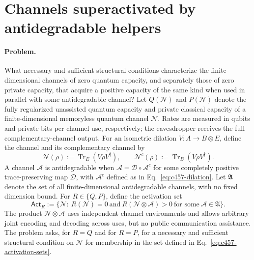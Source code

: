 \section{Channels superactivated by antidegradable helpers}
\label{sec:op_c45752aeb9a106bc}

\paragraph{Problem.}
What necessary and sufficient structural conditions characterize the finite-dimensional channels of zero quantum capacity, and separately those of zero private capacity, that acquire a positive capacity of the same kind when used in parallel with some antidegradable channel?
Let $Q(\mathcal N)$ and $P(\mathcal N)$ denote the fully regularized unassisted quantum capacity and private classical capacity of a finite-dimensional memoryless quantum channel $\mathcal N$. Rates are measured in qubits and private bits per channel use, respectively; the eavesdropper receives the full complementary-channel output. For an isometric dilation $V:A\to B\otimes E$, define the channel and its complementary channel by
\begin{equation}
 \mathcal N(\rho):=\operatorname{Tr}_E(V\rho V^\dagger),
 \qquad
 \mathcal N^c(\rho):=\operatorname{Tr}_B(V\rho V^\dagger).
 \label{eq:c457-dilation}
\end{equation}
A channel $\mathcal A$ is antidegradable when $\mathcal A=\mathcal D\circ\mathcal A^c$ for some completely positive trace-preserving map $\mathcal D$, with $\mathcal A^c$ defined as in Eq.~\eqref{eq:c457-dilation}. Let $\mathfrak A$ denote the set of all finite-dimensional antidegradable channels, with no fixed dimension bound. For $R\in\{Q,P\}$, define the activation set
\begin{equation}
 \mathsf{Act}_R:=\bigl\{\mathcal N:\ R(\mathcal N)=0\ \text{and}\ R(\mathcal N\otimes\mathcal A)>0\ \text{for some}\ \mathcal A\in\mathfrak A\bigr\}.
 \label{eq:c457-activation-sets}
\end{equation}
The product $\mathcal N\otimes\mathcal A$ uses independent channel environments and allows arbitrary joint encoding and decoding across uses, but no public communication assistance. The problem asks, for $R=Q$ and for $R=P$, for a necessary and sufficient structural condition on $\mathcal N$ for membership in the set defined in Eq.~\eqref{eq:c457-activation-sets}.

